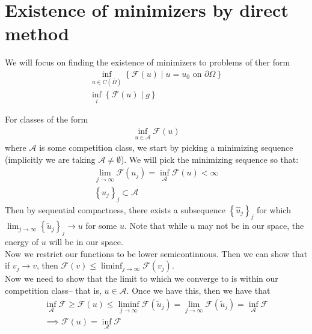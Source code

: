 \documentclass{memoir}
\begin{document}


\section{Existence of minimizers by direct method}
\label{sec:existence_of_minimizers_by_direct_method}

We will focus on finding the existence of minimizers to problems of ther form
\begin{align*}
	\inf_{u \in C(\overline{\Omega }) } \left\{\mathcal{F}(u) \mid u=u_0 \text{ on }\partial \Omega  \right\} \\
	\inf_{i} \left\{ \mathcal{F}(u) \mid g \right\} 
\end{align*}

For classes of the form
\begin{align*}
	\inf_{u \in \mathcal{A}} \mathcal{F}(u)
\end{align*}
where \(\mathcal{A}\) is some competition class, we start by picking a minimizing sequence (implicitly we are taking \(\mathcal{A}\neq \emptyset\)). We will pick the minimizing sequence so that:
\begin{align*}
	\lim_{j \to \infty} \mathcal{F}(u_j) = \inf_{\mathcal{A}} \mathcal{F}(u) < \infty\\
	\left\{ u_j \right\}_j \subset \mathcal{A}
\end{align*}
Then by sequential compactness, there exists a subsequence \(\left\{ \hat{u}_j \right\}_j\) for which \(\lim_{j \to \infty} \left\{ \tilde{u}_j \right\}_j \to u\) for some \(u\). Note that while \(u\) may not be in our space, the energy of \(u\) will be in our space.\\

Now we restrict our functions to be lower semicontinuous. Then we can show that if \(v_j \to v\), then \(\mathcal{F}(v) \leq \liminf_{j \to \infty} \mathcal{F}(v_j)\).\\

Now we need to show that the limit to which we converge to is within our competition class-- that is, \(u \in \mathcal{A}\). Once we have this, then we have that
\begin{align*}
	\inf_{\mathcal{A}} \mathcal{F} \geq \mathcal{F}(u) \leq \liminf_{j \to \infty} \mathcal{F}(\tilde{u}_j) = \lim_{j \to \infty} \mathcal{F}(\tilde{u}_j) = \inf_{\mathcal{A}} \mathcal{F}\\
	\implies \mathcal{F}(u) = \inf_{\mathcal{A}} \mathcal{F}
\end{align*}
\end{document}
